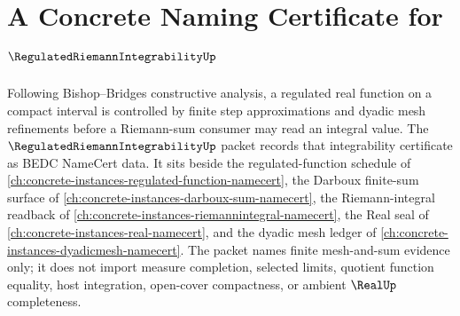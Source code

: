 \chapter{A Concrete Naming Certificate for $\RegulatedRiemannIntegrabilityUp$}
\label{ch:concrete-instances-regulated-riemann-integrability-namecert}

Following Bishop--Bridges constructive analysis, a regulated real function on a compact interval is controlled by finite step approximations and dyadic mesh refinements before a Riemann-sum consumer may read an integral value. The $\RegulatedRiemannIntegrabilityUp$ packet records that integrability certificate as BEDC NameCert data. It sits beside the regulated-function schedule of \autoref{ch:concrete-instances-regulated-function-namecert}, the Darboux finite-sum surface of \autoref{ch:concrete-instances-darboux-sum-namecert}, the Riemann-integral readback of \autoref{ch:concrete-instances-riemannintegral-namecert}, the Real seal of \autoref{ch:concrete-instances-real-namecert}, and the dyadic mesh ledger of \autoref{ch:concrete-instances-dyadicmesh-namecert}. The packet names finite mesh-and-sum evidence only; it does not import measure completion, selected limits, quotient function equality, host integration, open-cover compactness, or ambient $\RealUp$ completeness.

